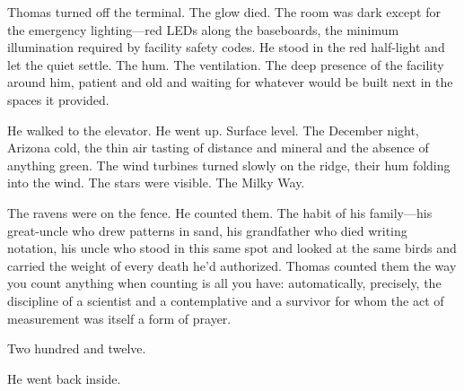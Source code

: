 Thomas turned off the terminal. The glow died. The room was dark except for the emergency lighting---red LEDs along the baseboards, the minimum illumination required by facility safety codes. He stood in the red half-light and let the quiet settle. The hum. The ventilation. The deep presence of the facility around him, patient and old and waiting for whatever would be built next in the spaces it provided.

He walked to the elevator. He went up. Surface level. The December night, Arizona cold, the thin air tasting of distance and mineral and the absence of anything green. The wind turbines turned slowly on the ridge, their hum folding into the wind. The stars were visible. The Milky Way.

The ravens were on the fence. He counted them. The habit of his family---his great-uncle who drew patterns in sand, his grandfather who died writing notation, his uncle who stood in this same spot and looked at the same birds and carried the weight of every death he'd authorized. Thomas counted them the way you count anything when counting is all you have: automatically, precisely, the discipline of a scientist and a contemplative and a survivor for whom the act of measurement was itself a form of prayer.

Two hundred and twelve.

He went back inside.
